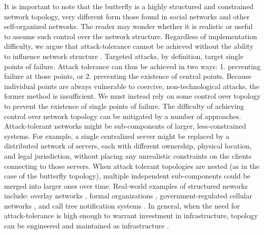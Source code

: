 \documentclass[10pt,letterpaper]{article}
\providecommand{\DIFdelbegin}{} %
\providecommand{\DIFdelend}{} %
\begin{document}
It is important to note that the butterfly is a highly structured and constrained
network topology,
very different form those found in social networks and other
self-organized networks.
The reader may wonder whether it is realistic or useful to assume such control over
the network structure.
Regardless of implementation difficulty,
we argue that \DIFdelbegin %
\DIFdelend attack-tolerance cannot be achieved without the ability to influence
network structure\DIFdelbegin %
\DIFdelend .
Targeted attacks, by definition, target single points of failure.
Attack tolerance can thus be achieved in two ways: 1. preventing failure at
those points, or 2. preventing the existence of central points.
Because individual points are always vulnerable to coercive, non-technological
attacks, the former method is insufficient.
We must instead rely on some control over topology to prevent the existence of
single points of failure.
The difficulty of achieving control over network topology can be mitigated by
a number of approaches.
Attack-tolerant networks might be sub-components of
larger, less-constrained systems.
For example, a single centralized server might be replaced by a distributed
network of servers,
each with different ownership, physical location, and legal jurisdiction,
without placing any unrealistic constraints on the clients connecting to
those servers.
When attack tolerant topologies are nested (as in the case of the butterfly
topology), multiple independent sub-components could be merged into larger
ones over time.
Real-world examples of structured neworks include: overlay networks
\cite{lua_survey_2005, korzun_structured_2013},
formal organizations \cite{mohr_explaining_1982},
government-regulated cellular networks \cite{walker_mass_2012},
and call tree notification systems \cite{nickerson_thinking_2010}.
In general,
\DIFdelbegin %
\DIFdelend when the need for attack-tolerance is high enough to warrant investment
in infrastructure, topology can be engineered and maintained as infrastructure\DIFdelbegin %
\DIFdelend .
\end{document}
